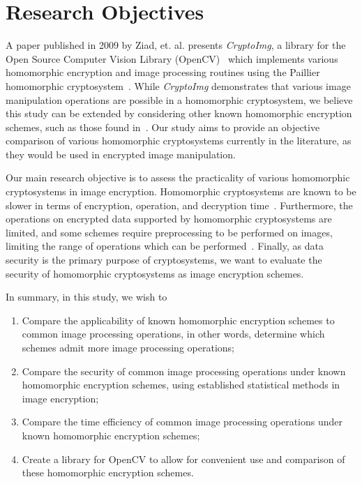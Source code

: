 \section{Research Objectives}

A paper published in 2009 by Ziad, et. al. presents \textit{CryptoImg}, a library for the  Open Source Computer Vision Library (OpenCV)~\cite{bradski_opencv_2000} which implements various homomorphic encryption and image processing routines using the Paillier homomorphic cryptosystem~\cite{ziad_cryptoimg:_2016}. While \textit{CryptoImg} demonstrates that various image manipulation operations are possible in a homomorphic cryptosystem, we believe this study can be extended by considering other known homomorphic encryption schemes, such as those found in~\cite{li_elliptic_2012, hutchison_fully_2010}. Our study aims to provide an objective comparison of various homomorphic cryptosystems currently in the literature, as they would be used in encrypted image manipulation.

Our main research objective is to assess the practicality of various homomorphic cryptosystems in image encryption. Homomorphic cryptosystems are known to be slower in terms of encryption, operation, and decryption time~\cite{sen_homomorphic_2013}. Furthermore, the operations on encrypted data supported by homomorphic cryptosystems are limited, and some schemes require preprocessing to be performed on images, limiting the range of operations which can be performed~\cite{li_elliptic_2012}. Finally, as data security is the primary purpose of cryptosystems, we want to evaluate the security of homomorphic cryptosystems as image encryption schemes.

In summary, in this study, we wish to
\begin{enumerate}
    \item Compare the applicability of known homomorphic encryption schemes to common image processing operations, in other words, determine which schemes admit more image processing operations;
		\item Compare the security of common image processing operations under known homomorphic encryption schemes, using established statistical methods in image encryption;
    \item Compare the time efficiency of common image processing operations under known homomorphic encryption schemes;
    \item Create a library for OpenCV to allow for convenient use and comparison of these homomorphic encryption schemes.
\end{enumerate}
